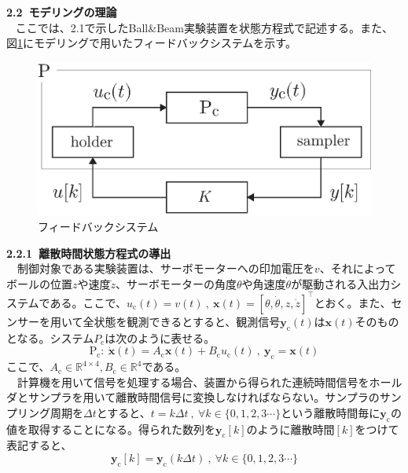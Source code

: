 \documentclass[a4paper,10.5pt]{ltjsarticle}
\begin{document}
{\large \bfseries 2.2 モデリングの理論}\\
  ここでは、2.1で示したBall\&Beam実験装置を状態方程式で記述する。また、図\ref{fig:figure2}にモデリングで用いたフィードバックシステムを示す。
\begin{figure}[h]
  \centering
  \includegraphics[scale=0.7]{figure2.eps}
  \vspace{-30pt}\caption{フィードバックシステム}
  \label{fig:figure2}
\end{figure}
\clearpage
{\large \bfseries 2.2.1 離散時間状態方程式の導出}\\
　制御対象である実験装置は、サーボモーターへの印加電圧を$v$、それによってボールの位置$z$や速度$\dot{z}$、サーボモーターの角度$\theta$や角速度$\dot{\theta}$が駆動される入出力システムである。ここで、$u_\mathrm{c}(t)=v(t)\ ,\ \bm x(t)=[\theta,\dot{\theta},z,\dot{z}]^\top$とおく。また、センサーを用いて全状態を観測できるとすると、観測信号$\bm y_\mathrm{c}(t)$は$\bm x(t)$そのものとなる。システム$P_\mathrm{c}$は次のように表せる。
\begin{equation}
  \mathrm{P_c}:\ \dot{\bm x}(t)=A_\mathrm{c}\bm x (t)+B_\mathrm{c}u_\mathrm{c}(t)\ ,\ \bm y_\mathrm{c}=\bm x(t)
\end{equation}
ここで、$A_\mathrm{c}\in \mathbb{R}^{4\times4},B_\mathrm{c}\in \mathbb{R}^4$である。\\
　計算機を用いて信号を処理する場合、装置から得られた連続時間信号をホールダとサンプラを用いて離散時間信号に変換しなければならない。サンプラのサンプリング周期を$\Delta t$とすると、$t=k\Delta t\ ,\ \forall k\in\{0,1,2,3\cdots\}$という離散時間毎に$\bm y_\mathrm{c}$の値を取得することになる。得られた数列を$\bm y_\mathrm{c}[k]$のように離散時間$[k]$をつけて表記すると、
\begin{equation}
  \bm y_\mathrm{c}[k]=\bm y_\mathrm{c}(k\Delta t)\ ,\ \forall k\in\{0,1,2,3\cdots\}
\end{equation}
\end{document}
